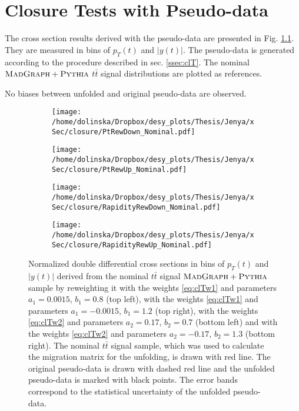 \chapter{Closure Tests with Pseudo-data}\label{appendix:closT}

The cross section results derived with the pseudo-data are presented in Fig. \ref{fig:closT}. They are measured in bins 
of $p_{T}(t)$ and $|y(t)|$. The pseudo-data is generated according to the procedure described in sec. \ref{ssec:clT}.
The nominal $\textsc{MadGraph}+\textsc{Pythia}$ $t\bar{t}$ signal distributions are plotted as references.

No biases between unfolded and original pseudo-data are observed.

\begin{figure}[p]
\centering
\begin{subfigure}
  \centering
  \texttt{[image: /home/dolinska/Dropbox/desy\_plots/Thesis/Jenya/xSec/closure/PtRewDown\_Nominal.pdf]}
\end{subfigure}
\begin{subfigure}
  \centering
  \texttt{[image: /home/dolinska/Dropbox/desy\_plots/Thesis/Jenya/xSec/closure/PtRewUp\_Nominal.pdf]}
\end{subfigure}
\begin{subfigure}
  \centering
  \texttt{[image: /home/dolinska/Dropbox/desy\_plots/Thesis/Jenya/xSec/closure/RapidityRewDown\_Nominal.pdf]}
\end{subfigure}
\begin{subfigure}
  \centering
  \texttt{[image: /home/dolinska/Dropbox/desy\_plots/Thesis/Jenya/xSec/closure/RapidityRewUp\_Nominal.pdf]}
\end{subfigure}
\caption{Normalized double differential cross sections in bins of $p_{T}(t)$ and $|y(t)|$ derived from the nominal $t\bar{t}$ signal $\textsc{MadGraph}+\textsc{Pythia}$
         sample by reweighting it with the weights \ref{eq:clTw1} and parameters  $a_{1} = 0.0015$, $b_{1} = 0.8$ (top left), 
         with the weights \ref{eq:clTw1} and parameters  $a_{1} = -0.0015$, $b_{1} = 1.2$ (top right), with the weights \ref{eq:clTw2} and parameters 
         $a_{2} = 0.17$, $b_{2} = 0.7$ (bottom left) and with the weights \ref{eq:clTw2} and parameters  $a_{2} = -0.17$, $b_{2} = 1.3$ (bottom right).
         The nominal $t\bar{t}$ signal sample, which was used to calculate the migration matrix for the unfolding, is drawn with red line. The original
         pseudo-data is drawn with dashed red line and the unfolded pseudo-data is marked with black points. The error bands correspond to the statistical
         uncertainty of the unfolded pseudo-data.}
\label{fig:closT}
\end{figure}